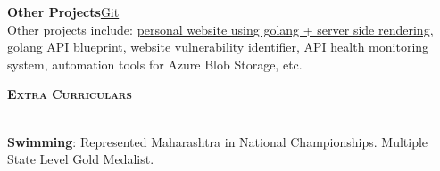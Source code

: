 \documentclass[a4paper]{article}
\newcommand{\lineunder} {
\vspace*{-8pt} \\
\hspace*{-18pt} \hrulefill \\
}
\newcommand{\header}[1]{%
{\hspace*{-18pt}\vspace*{6pt} \textsc{\textbf{\Large{#1}}}}%
\vspace*{-6pt} \lineunder
}
\begin{document}

{\textbf{Other Projects}\hfill \href{https://github.com/swarnimcodes/}{Git}} \\
Other projects include: 
\href{https://github.com/swarnimcodes/website}{personal website using golang + server side rendering},
\href{https://github.com/swarnimcodes/apigo}{golang API blueprint},
\href{https://github.com/swarnimcodes/website-security-checker}{website vulnerability identifier},
API health monitoring system, 
automation tools for Azure Blob Storage, etc.
\vspace{2mm}


\vspace{2mm}
\header{Extra Curriculars}
\vspace{1mm}

\textbf{Swimming}: Represented Maharashtra in National Championships. Multiple State Level Gold Medalist.
\end{document}
